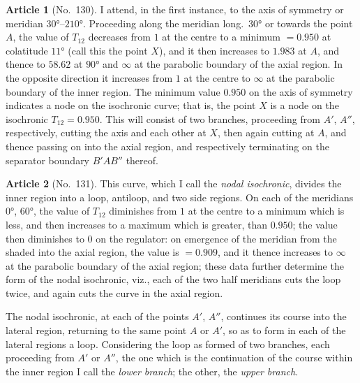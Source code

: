 \documentclass[11pt,a4paper]{article}
\theoremstyle{definition}
\newtheorem{art}{Article}
\begin{document}
\begin{art}[No.~130]
I attend, in the first instance, to the axis of symmetry or meridian $30°$--$210°$. Proceeding along the meridian long.~$30°$ or towards the point $A$, the value of $T_{12}$ decreases from $1$ at the centre to a minimum $= 0.950$ at colatitude $11°$ (call this the point $X$), and it then increases to $1.983$ at $A$, and thence to $58.62$ at $90°$ and $\infty$ at the parabolic boundary of the axial region. In the opposite direction it increases from $1$ at the centre to $\infty$ at the parabolic boundary of the inner region. The minimum value $0.950$ on the axis of symmetry indicates a node on the isochronic curve; that is, the point $X$ is a node on the isochronic $T_{12} = 0.950$. This will consist of two branches, proceeding from $A'$, $A''$, respectively, cutting the axis and each other at $X$, then again cutting at $A$, and thence passing on into the axial region, and respectively terminating on the separator boundary $B'AB''$ thereof.
\end{art}

\begin{art}[No.~131]
This curve, which I call the \emph{nodal isochronic}, divides the inner region into a loop, antiloop, and two side regions. On each of the meridians $0°$, $60°$, the value of $T_{12}$ diminishes from $1$ at the centre to a minimum which is less, and then increases to a maximum which is greater, than $0.950$; the value then diminishes to $0$ on the regulator: on emergence of the meridian from the shaded into the axial region, the value is $= 0.909$, and it thence increases to $\infty$ at the parabolic boundary of the axial region; these data further determine the form of the nodal isochronic, viz., each of the two half meridians cuts the loop twice, and again cuts the curve in the axial region.

The nodal isochronic, at each of the points $A'$, $A''$, continues its course into the lateral region, returning to the same point $A$ or $A'$, so as to form in each of the lateral regions a loop. Considering the loop as formed of two branches, each proceeding from $A'$ or $A''$, the one which is the continuation of the course within the inner region I call the \emph{lower branch}; the other, the \emph{upper branch}.
\end{art}
\end{document}
